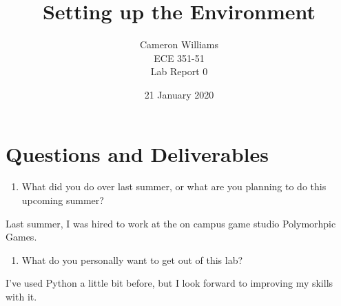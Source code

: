 \documentclass[12pt]{article}
\title{Setting up the Environment}
\author{Cameron Williams\\ECE 351-51\\Lab Report 0}
\date{21 January 2020}
\begin{document}
\vspace{\fill}
\maketitle
\vspace{\fill}
\clearpage

\newpage
\section*{Questions and Deliverables}

\begin{enumerate}
    \item What did you do over last summer, or what are you planning to do this upcoming summer?
\end{enumerate}
    \par Last summer, I was hired to work at the on campus game studio Polymorhpic Games.
\begin{enumerate}
    \item What do you personally want to get out of this lab?
\end{enumerate}
    \par I've used Python a little bit before, but I look forward to improving my skills with it.
    
\end{document}
